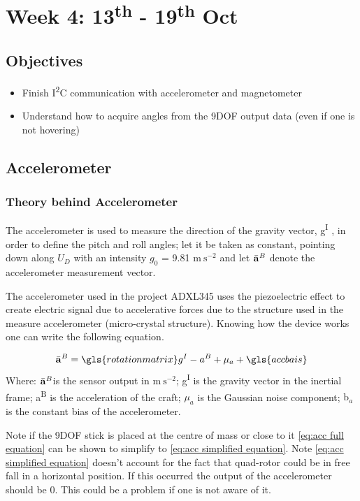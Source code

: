 \chapter{Week 4: 13\textsuperscript{th}  - 19\textsuperscript{th} Oct}
 \tocless\section{Objectives}
\begin{itemize}
	\item Finish I\textsuperscript2C communication with accelerometer and magnetometer
	\item Understand how to acquire angles from the 9DOF output data (even if one is not hovering)
\end{itemize}

 \tocless\section{Accelerometer}
\subsection{Theory behind Accelerometer}
The accelerometer is used to measure the direction of the gravity vector, g\textsuperscript I , in order to define the pitch and roll angles; let it be taken as constant, pointing down along $U_D$ with an intensity $g_0$ = 9.81 $\mathrm{m~s^{-2}}$ and let
$\bar{\bf a}^B$ denote the accelerometer measurement vector.

The accelerometer used in the project ADXL345 uses the piezoelectric effect to create electric signal due to accelerative forces due to the structure used in the measure accelerometer (micro-crystal structure). Knowing how the device works one can write the following equation.

\begin{equation}
\bar{\bf a}^B = \gls{rotationmatrix}g^I - a^B +\mu_a+ \gls{accbais}  \label{eq:acc full equation}
\end{equation}
Where: $\bar{\bf a}^B$is the sensor output in $\mathrm{m~s^{-2}}$;  g\textsuperscript I is the gravity vector in the inertial frame; a\textsuperscript B is the acceleration of the craft; $\mu_a$ is the Gaussian noise component; $\mathrm{b}_a$ is the constant bias of the accelerometer.


Note if the 9DOF stick is placed at the centre of mass or close to it \eqref{eq:acc full equation} can  be shown to simplify to \eqref{eq:acc simplified equation}. Note  \eqref{eq:acc simplified equation} doesn't account for the fact that quad-rotor could be in free
fall in a horizontal position. If this occurred the output of the accelerometer should be 0. This could be a problem if one is not aware of it.

